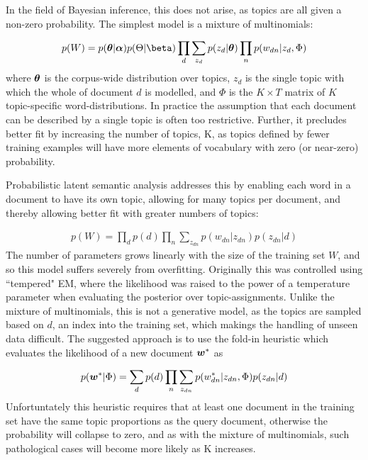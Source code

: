 In the field of Bayesian inference, this does not arise, as topics are all given a non-zero probability. The simplest model is a mixture of multinomials\cite{Nigam2000}:

\begin{align}
p(W) = p(\vv{\theta}|\vv{\alpha})p(\Theta|\vv{\beta}) \prod_d \sum_{z_d} p(z_d|\vv{\theta})\prod_n p(w_{dn} | z_d, \Phi)
\end{align}
where $\bm \theta$ is the corpus-wide distribution over topics, $z_d$ is the single topic with which the whole of document $d$ is modelled, and $\Phi$ is the $K \times T$ matrix of $K$ topic-specific word-distributions. In practice the assumption that each document can be described by a single topic is often too restrictive. Further, it precludes better fit by increasing the number of topics, K, as topics defined by fewer training examples will have more elements of vocabulary with zero (or near-zero) probability.

Probabilistic latent semantic analysis\cite{Hofmann1999a} addresses this by enabling each word in a document to have its own topic, allowing for many topics per document, and thereby allowing better fit with greater numbers of topics:

\begin{align}
p(W) = \prod_d p(d) \prod_n \sum_{z_{dn}} p(w_{dn}|z_{dn})p(z_{dn}|d)
\end{align}
The number of parameters grows linearly with the size of the training set $W$, and so this model suffers severely from overfitting. Originally this was controlled using ``tempered" EM, where the likelihood was raised to the power of a temperature parameter when evaluating the posterior over topic-assignments. Unlike the mixture of multinomials, this is not a generative model, as the topics are sampled based on $d$, an index into the training set, which makings the handling of unseen data difficult. The suggested approach is to use the fold-in heuristic which evaluates the likelihood of a new document $\bm w^*$ as

\begin{align}
p(\bm w^*|\Phi) = \sum_d p(d) \prod_n \sum_{z_{dn}} p(w_{dn}^*|z_{dn}, \Phi) p(z_{dn}|d)
\end{align}
Unfortuntately this heuristic requires that at least one document in the training set have the same topic proportions as the query document, otherwise the probability will collapse to zero, and as with the mixture of multinomials, such pathological cases will become more likely as K increases.

